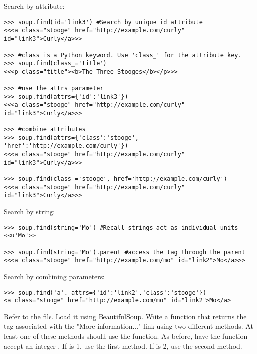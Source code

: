 Search by attribute:
\begin{lstlisting}
>>> soup.find(id='link3') #Search by unique id attribute
<<<a class="stooge" href="http://example.com/curly" id="link3">Curly</a>>>

>>> #class is a Python keyword. Use 'class_' for the attribute key.
>>> soup.find(class_='title')
<<<p class="title"><b>The Three Stooges</b></p>>>

>>> #use the attrs parameter
>>> soup.find(attrs={'id':'link3'})
<<<a class="stooge" href="http://example.com/curly" id="link3">Curly</a>>>

>>> #combine attributes
>>> soup.find(attrs={'class':'stooge', 'href':'http://example.com/curly'})
<<<a class="stooge" href="http://example.com/curly" id="link3">Curly</a>>>

>>> soup.find(class_='stooge', href='http://example.com/curly')
<<<a class="stooge" href="http://example.com/curly" id="link3">Curly</a>>>
\end{lstlisting}

Search by string:
\begin{lstlisting}
>>> soup.find(string='Mo') #Recall strings act as individual units
<<u'Mo'>>

>>> soup.find(string='Mo').parent #access the tag through the parent
<<<a class="stooge" href="http://example.com/mo" id="link2">Mo</a>>>
\end{lstlisting}

Search by combining parameters:
\begin{lstlisting}
>>> soup.find('a', attrs={'id':'link2','class':'stooge'})
<a class="stooge" href="http://example.com/mo" id="link2">Mo</a>
\end{lstlisting}

\begin{problem}
Refer to the  file.
Load it using BeautifulSoup.
Write a function that returns the tag associated with the "More information..." link using two different methods.
At least one of these methods should use the  function.
As before, have the function accept an integer .
If  is 1, use the first method.
If  is 2, use the second method.
\end{problem}

